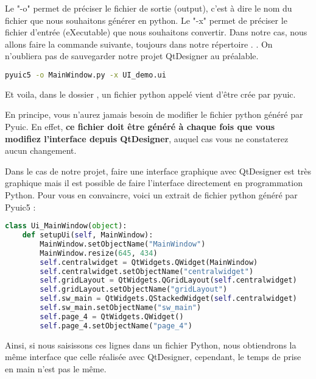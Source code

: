 Le "-o" permet de préciser le fichier de sortie (output), c'est à dire le nom du fichier que nous souhaitons générer en python. \newline \newline
Le "-x" permet de préciser le fichier d'entrée (eXecutable) que nous souhaitons convertir. \newline \newline
Dans notre cas, nous allons faire la commande suivante, toujours dans notre répertoire . \newline.
On n'oubliera pas de sauvegarder notre projet QtDesigner au préalable.
\begin{lstlisting}[language=bash]
pyuic5 -o MainWindow.py -x UI_demo.ui
\end{lstlisting}
Et voila, dans le dossier , un fichier python appelé  vient d'être crée par pyuic. \newline

En  principe,  vous  n’aurez  jamais  besoin  de  modifier  le  fichier  python généré par Pyuic. En  effet, \textbf{{\color{red}ce  fichier  doit être généré à chaque  fois  que  vous  modifiez l’interface depuis QtDesigner}}, auquel cas vous ne constaterez aucun changement. \newline

Dans le cas de notre projet, faire une interface graphique avec QtDesigner est très graphique mais il est possible de faire l'interface directement en programmation Python. \newline
Pour vous en convaincre, voici un extrait de fichier python généré par Pyuic5 : \newline

\begin{lstlisting}[language=python]
class Ui_MainWindow(object):
    def setupUi(self, MainWindow):
        MainWindow.setObjectName("MainWindow")
        MainWindow.resize(645, 434)
        self.centralwidget = QtWidgets.QWidget(MainWindow)
        self.centralwidget.setObjectName("centralwidget")
        self.gridLayout = QtWidgets.QGridLayout(self.centralwidget)
        self.gridLayout.setObjectName("gridLayout")
        self.sw_main = QtWidgets.QStackedWidget(self.centralwidget)
        self.sw_main.setObjectName("sw_main")
        self.page_4 = QtWidgets.QWidget()
        self.page_4.setObjectName("page_4")
\end{lstlisting}
Ainsi, si nous saisissons ces lignes dans un fichier Python, nous obtiendrons la même interface que celle réalisée avec QtDesigner, cependant, le temps de prise en main n'est pas le même. \newline

